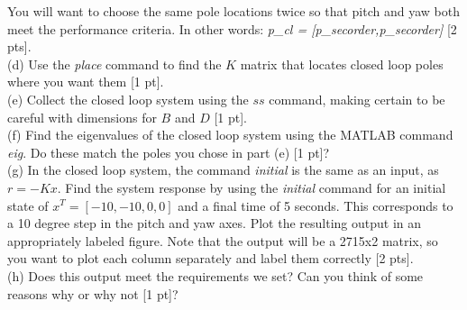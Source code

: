 \documentclass[12pt,letterpaper,onecolumn]{report}
\begin{document}
You will want to choose the same pole locations twice so that pitch and yaw both meet the performance criteria.  In other words: \textit{p\_cl = [p\_secorder,p\_secorder]} [2 pts].\\
\noindent(d) Use the \textit{place} command to find the $K$ matrix that locates closed loop poles where you want them [1 pt].\\
\noindent(e) Collect the closed loop system using the $ss$ command, making certain to be careful with dimensions for $B$ and $D$ [1 pt].\\
\noindent(f) Find the eigenvalues of the closed loop system using the MATLAB command \textit{eig}.  Do these match the poles you chose in part (e) [1 pt]?\\
\noindent(g) In the closed loop system, the command \textit{initial} is the same as an input, as $r=-Kx$.  Find the system response by using the \textit{initial} command for an initial state of $x^T=[-10,-10,0,0]$ and a final time of 5 seconds.  This corresponds to a 10 degree step in the pitch and yaw axes.  Plot the resulting output in an appropriately labeled figure.  Note that the output will be a 2715x2 matrix, so you want to plot each column separately and label them correctly [2 pts].\\
\noindent(h) Does this output meet the requirements we set?  Can you think of some reasons why or why not [1 pt]?\\
\end{document}
